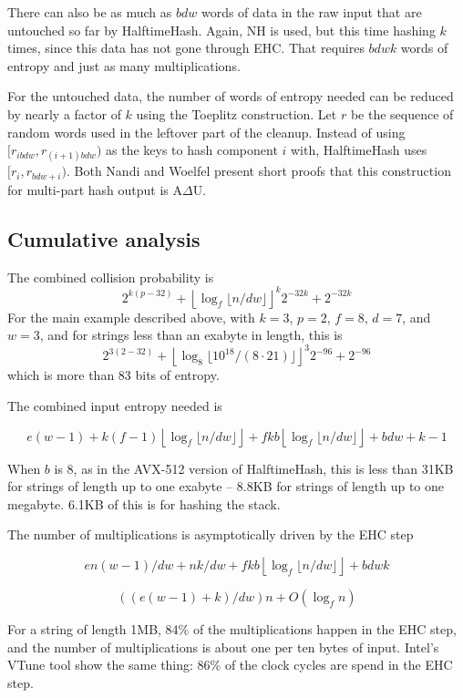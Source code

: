 \documentclass[sigconf, nonacm]{acmart}
\begin{document}
There can also be as much as $b d w$ words of data in the raw input that are untouched so far by HalftimeHash.
Again, NH is used, but this time hashing $k$ times, since this data has not gone through EHC.
That requires $b d w k$ words of entropy and just as many multiplications.

For the untouched data, the number of words of entropy needed can be reduced by nearly a factor of $k$ using the Toeplitz construction. 
Let $r$ be the sequence of random words used in the leftover part of the cleanup.
Instead of using $[r_{ibdw}, r_{(i+1)bdw})$ as the keys to hash component $i$ with, HalftimeHash uses $[r_{i}, r_{bdw + i})$.
Both Nandi and Woelfel present short proofs that this construction for multi-part hash output is A$\Delta$U. \cite{ehc-nandi,woelfel-toeplitz}


\subsection{Cumulative analysis}

The combined collision probability is
\[2^{k(p-32)} + \left\lfloor \log_f \lfloor n / d w \rfloor \right\rfloor^k 2^{-32k} + 2^{-32k}\]
For the main example described above, with $k=3$, $p=2$, $f=8$, $d = 7$, and $w=3$, and for strings less than an exabyte in length, this is
\[2^{3(2-32)} + \left\lfloor \log_8 \lfloor 10^{18} /(8 \cdot 21) \rfloor \right\rfloor^3 2^{-96} + 2^{-96}\]
which is more than 83 bits of entropy.

The combined input entropy needed is

\[
e(w-1)
+ k(f-1)\left\lfloor\log_f \lfloor n/dw\rfloor\right\rfloor
+ f k b \left\lfloor\log_f \lfloor n/dw\rfloor\right\rfloor
+ b d w + k - 1
\]

When $b$ is 8, as in the AVX-512 version of HalftimeHash, this is less than 31KB for strings of length up to one exabyte -- 8.8KB for strings of length up to one megabyte.
6.1KB of this is for hashing the stack.

The number of multiplications is asymptotically driven by the EHC step

\[
en(w-1)/dw + nk/dw + f k b \left\lfloor\log_f \lfloor n/dw\rfloor\right\rfloor + b d w k
\]

\[
((e(w-1) + k)/dw)n + O(\log_f n)
\]

For a string of length 1MB, 84\% of the multiplications happen in the EHC step, and the number of multiplications is about one per ten bytes of input.
Intel's VTune tool show the same thing: 86\% of the clock cycles are spend in the EHC step.
\end{document}
